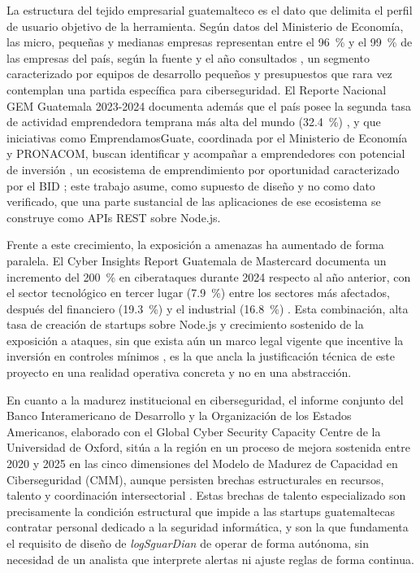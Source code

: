 La estructura del tejido empresarial guatemalteco es el dato que delimita el perfil de usuario
objetivo de la herramienta. Según datos del Ministerio de Economía, las micro, pequeñas y
medianas empresas representan entre el 96~\% y el 99~\% de las empresas del país, según la fuente y el año consultados
\cite{mineco2015mipyme,agn2025mipymes}, un segmento caracterizado por equipos de desarrollo pequeños y
presupuestos que rara vez contemplan una partida específica para ciberseguridad. El Reporte
Nacional GEM Guatemala 2023-2024 documenta además que el país posee la segunda tasa de
actividad emprendedora temprana más alta del mundo (32.4~\%) \cite{gem2024}, y que iniciativas
como EmprendamosGuate, coordinada por el Ministerio de Economía y PRONACOM, buscan identificar y acompañar a emprendedores con potencial de inversión \cite{pronacom}, un
ecosistema de emprendimiento por oportunidad caracterizado por el BID \cite{iadb2024}; este trabajo
asume, como supuesto de diseño y no como dato verificado, que una parte sustancial de las
aplicaciones de ese ecosistema se construye como APIs REST sobre Node.js.

Frente a este crecimiento, la exposición a amenazas ha aumentado de forma paralela. El Cyber
Insights Report Guatemala de Mastercard documenta un incremento del 200~\% en ciberataques
durante 2024 respecto al año anterior, con el sector tecnológico en tercer lugar (7.9~\%) entre los sectores más afectados, después del
financiero (19.3~\%) y el industrial (16.8~\%) \cite{mastercard2025,republicamastercard2025}. Esta combinación, alta tasa de creación de startups sobre Node.js
y crecimiento sostenido de la exposición a ataques, sin que exista aún un marco legal vigente que
incentive la inversión en controles mínimos \cite{lahora2026estancada}, es la que ancla la
justificación técnica de este proyecto en una realidad operativa concreta y no en una abstracción.

En cuanto a la madurez institucional en ciberseguridad, el informe conjunto del Banco
Interamericano de Desarrollo y la Organización de los Estados Americanos, elaborado con el
Global Cyber Security Capacity Centre de la Universidad de Oxford, sitúa a la región en un proceso
de mejora sostenida entre 2020 y 2025 en las cinco dimensiones del Modelo de Madurez de
Capacidad en Ciberseguridad (CMM), aunque persisten brechas estructurales en recursos, talento y
coordinación intersectorial \cite{bidoea2025}. Estas brechas de talento especializado son
precisamente la condición estructural que impide a las startups guatemaltecas contratar personal
dedicado a la seguridad informática, y son la que fundamenta el requisito de diseño de
\textit{logSguarDian} de operar de forma autónoma, sin necesidad de un analista que interprete
alertas ni ajuste reglas de forma continua.

